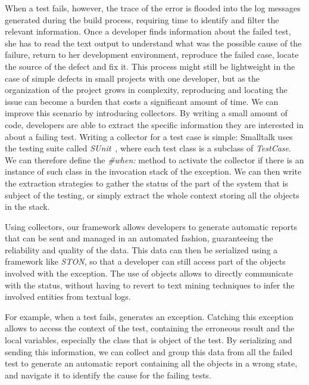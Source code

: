 When a test fails, however, the trace of the error is flooded into the log messages generated during the build process, requiring time to identify and filter the relevant information.
Once a developer finds information about the failed test, she has to read the text output to understand what was the possible cause of the failure, return to her development environment, reproduce the failed case, locate the source of the defect and fix it.
This process might still be lightweight in the case of simple defects in small projects with one developer, but as the organization of the project grows in complexity, reproducing and locating the issue can become a burden that costs a significant amount of time.
We can improve this scenario by introducing \sln collectors.
By writing a small amount of code, developers are able to extract the specific information they are interested in about a failing test.
Writing a collector for a test case is simple: Smalltalk uses the testing suite called \textit{SUnit}~\cite{Beck1994a}, where each test class is a subclass of \textit{TestCase}.
We can therefore define the \textit{\#when:} method to activate the collector if there is an instance of such class in the invocation stack of the exception.
We can then write the extraction strategies to gather the status of the part of the system that is subject of the testing, or simply extract the whole context storing all the objects in the stack.

Using collectors, our framework allows developers to generate automatic reports that can be sent and managed in an automated fashion, guaranteeing the reliability and quality of the data.
This data can then be serialized using a framework like \textit{STON}, so that a developer can still access part of the objects involved with the exception.
The use of objects allows to directly communicate with the status, without having to revert to text mining techniques to infer the involved entities from textual logs.

For example, when a test fails,  generates an  exception.
Catching this exception allows to access the context of the test, containing the erroneous result and the local variables, especially the class that is object of the test.
By serializing and sending this information, we can collect and group this data from all the failed test to generate an automatic report containing all the objects in a wrong state, and navigate it to identify the cause for the failing tests.

